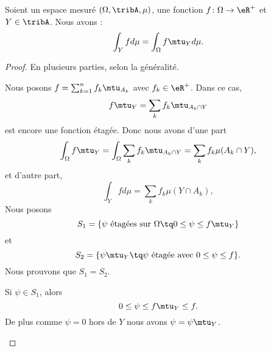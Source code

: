 \begin{lemma}       \label{LEMooSPOFooBxDEAV}
	Soient un espace mesuré \( (\Omega,\tribA,\mu)\), une fonction \( f\colon \Omega\to \eR^+\) et \( Y\in\tribA\). Nous avons :
	\begin{equation}        \label{EQooSBDKooPTDEcr}
		\int_Yfd\mu=\int_{\Omega}f\mtu_Yd\mu.
	\end{equation}
\end{lemma}

\begin{proof}
	En plusieurs parties, selon la généralité.
	\begin{subproof}
		Nous posons \( f=\sum_{k=1}^nf_k\mtu_{A_k}\) avec \( f_k\in \eR^+\). Dans ce cas,
		\begin{equation}
			f\mtu_Y=\sum_kf_k\mtu_{A_k\cap Y}
		\end{equation}
		est encore une fonction étagée. Donc nous avons d'une part
		\begin{equation}
			\int_{\Omega}f\mtu_Y=\int_{\Omega}\sum_kf_k\mtu_{A_k\cap Y}=\sum_kf_k\mu(A_k\cap Y),
		\end{equation}
		et d'autre part,
		\begin{equation}
			\int_Yfd\mu=\sum_kf_k\mu(Y\cap A_k),
		\end{equation}
		Nous posons
		\begin{equation}
			S_1=\{ \psi\text{ étagées sur } \Omega\tq 0\leq \psi\leq  f\mtu_{Y} \}
		\end{equation}
		et
		\begin{equation}
			S_2=\{ \psi\mtu_Y\tq \psi\text{ étagée avec } 0\leq\psi\leq f \}.
		\end{equation}
		Nous prouvons que \( S_1=S_2\).

		Si \( \psi\in S_1\), alors
		\begin{equation}
			0\leq \psi\leq f\mtu_Y\leq f.
		\end{equation}
		De plus comme \( \psi=0\) hors de \( Y\) nous avons \( \psi=\psi\mtu_Y\).


\end{subproof}
\end{proof}
